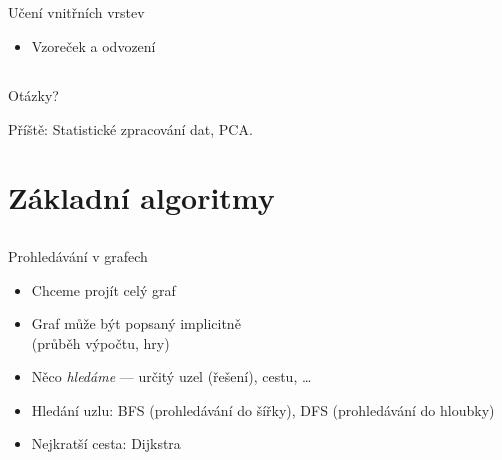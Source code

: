 \documentclass{beamer}
\begin{document}
\subsection{}
\begin{frame}{Učení vnitřních vrstev}
\begin{itemize}
\item Vzoreček a odvození
\end{itemize}
\end{frame}

\subsection{}
\begin{frame}{Otázky?}
\begin{center}
Příště: Statistické zpracování dat, PCA.
\end{center}
\end{frame}

\section{Základní algoritmy}

\subsection{}
\begin{frame}{Prohledávání v grafech}
\begin{itemize}
\item Chceme projít celý graf
\item Graf může být popsaný implicitně \\ (průběh výpočtu, hry)
\item Něco {\em hledáme} --- určitý uzel (řešení), cestu, \dots
\item Hledání uzlu: BFS (prohledávání do šířky), DFS (prohledávání do hloubky)
\item Nejkratší cesta: Dijkstra
\end{itemize}
\end{frame}
\end{document}
